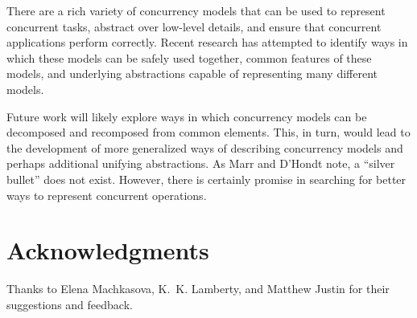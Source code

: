 \documentclass{sig-alternate}
\begin{document}
There are a rich variety of concurrency models that can be used to represent concurrent tasks, abstract over low-level details, and ensure that concurrent applications perform correctly. Recent research has attempted to identify ways in which these models can be safely used together, common features of these models, and underlying abstractions capable of representing many different models.

Future work will likely explore ways in which concurrency models can be decomposed and recomposed from common elements. This, in turn, would lead to the development of more generalized ways of describing concurrency models and perhaps additional unifying abstractions. As Marr and D'Hondt note, a ``silver bullet'' does not exist. However, there is certainly promise in searching for better ways to represent concurrent operations.

\section*{Acknowledgments}

Thanks to Elena Machkasova, K.~K. Lamberty, and Matthew Justin for their suggestions and feedback.

\printbibliography{}
\end{document}
